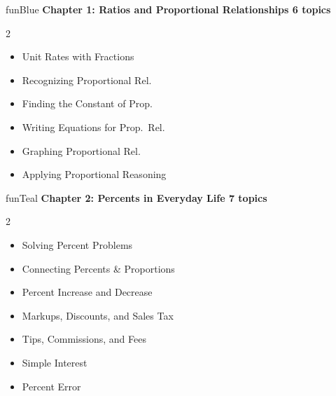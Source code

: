 
\thispagestyle{empty}

{
\sffamily


\begin{wbChapterStripe}{funBlue}
{\small\bfseries\color{black!80}Chapter 1: Ratios and Proportional Relationships%
\hfill\normalfont\color{black!50}6 topics}

\vspace{1mm}
\small
\begin{multicols}{2}
\begin{itemize}[leftmargin=4mm, itemsep=1pt, topsep=1pt]
    \item Unit Rates with Fractions
    \item Recognizing Proportional Rel.
    \item Finding the Constant of Prop.
    \item Writing Equations for Prop.\ Rel.
    \item Graphing Proportional Rel.
    \item Applying Proportional Reasoning
\end{itemize}
\end{multicols}
\end{wbChapterStripe}

\vspace{2mm}

\begin{wbChapterStripe}{funTeal}
{\small\bfseries\color{black!80}Chapter 2: Percents in Everyday Life%
\hfill\normalfont\color{black!50}7 topics}

\vspace{1mm}
\small
\begin{multicols}{2}
\begin{itemize}[leftmargin=4mm, itemsep=1pt, topsep=1pt]
    \item Solving Percent Problems
    \item Connecting Percents \& Proportions
    \item Percent Increase and Decrease
    \item Markups, Discounts, and Sales Tax
    \item Tips, Commissions, and Fees
    \item Simple Interest
    \item Percent Error
\end{itemize}
\end{multicols}
\end{wbChapterStripe}

}
